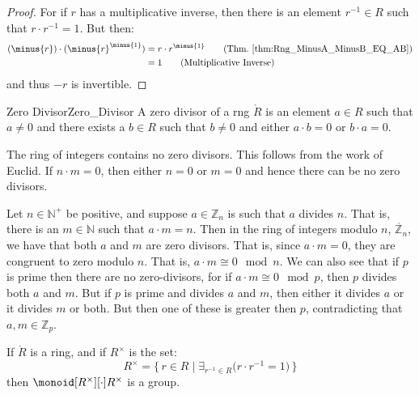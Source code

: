 \documentclass{article}                                                        %
\begin{document}
        \begin{proof}
            For if $r$ has a multiplicative inverse, then there is an
            element $r^{\minus{1}}\in{R}$ such that $r\cdot{r}^{\minus{1}}=1$.
            But then:
            \begin{align}
                (\minus{r})\cdot(\minus{r}^{\minus{1}})&=r\cdot{r}^{\minus{1}}
                    \tag{Thm.~\ref{thm:Rng_MinusA_MinusB_EQ_AB}}\\
                &=1\tag{Multiplicative Inverse}
            \end{align}
            and thus $\minus{r}$ is invertible.
        \end{proof}
        \begin{fdefinition}{Zero Divisor}{Zero_Divisor}
            A zero divisor of a rng $\ring{R}$ is an element $a\in{R}$ such that
            $a\ne{0}$ and there exists a $b\in{R}$ such that $b\ne{0}$ and
            either $a\cdot{b}=0$ or $b\cdot{a}=0$.
        \end{fdefinition}
        \begin{example}
            The ring of integers contains no zero divisors. This follows from
            the work of Euclid. If $n\cdot{m}=0$, then either $n=0$ or $m=0$ and
            hence there can be no zero divisors.
        \end{example}
        \begin{example}
            Let $n\in\mathbb{N}^{+}$ be positive, and suppose
            $a\in\mathbb{Z}_{n}$ is such that $a$ divides $n$. That is, there is
            an $m\in\mathbb{N}$ such that $a\cdot{m}=n$. Then in the ring of
            integers modulo $n$, $\ring{\mathbb{Z}_{n}}$, we have that both
            $a$ and $m$ are zero divisors. That is, since $a\cdot{m}=0$, they
            are congruent to zero modulo $n$. That is,
            $a\cdot{m}\cong{0}\mod{n}$. We can also see that if $p$ is prime
            then there are no zero-divisors, for if $a\cdot{m}\cong{0}\mod{p}$,
            then $p$ divides both $a$ and $m$. But if $p$ is prime and divides
            $a$ and $m$, then either it divides $a$ or it divides $m$ or both.
            But then one of these is greater then $p$, contradicting that
            $a,m\in\mathbb{Z}_{p}$.
        \end{example}
        \begin{theorem}
            \label{thm:Group_of_Units_of_Ring_is_Group}%
            If $\ring{R}$ is a ring, and if $R^{\times}$ is the set:
            \begin{equation}
                R^{\times}=\big\{\,r\in{R}\;|\;
                    \exists_{r^{\minus{1}}\in{R}}
                    \big(r\cdot{r}^{\minus{1}}=1\big)\,\big\}
            \end{equation}
            then $\monoid[R^{\times}][\cdot]{R^{\times}}$ is a group.
        \end{theorem}
\end{document}
